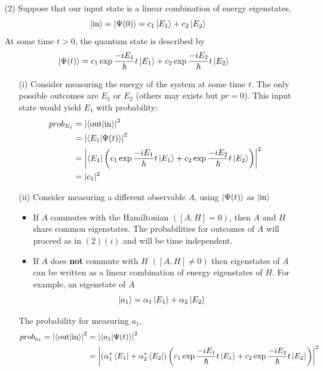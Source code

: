 \documentclass[english, 11pt]{article}
\begin{document}
\begin{itemize}
      \item[(2)] Suppose that our input state is a linear combination of energy eigenstates,
      \[ \left|\mbox{in}\right\rangle = \left|\Psi(0)\right\rangle = c_1\left|E_1\right\rangle + c_2\left|E_2\right\rangle \]
      At some time $t > 0$, the quantum state is described by
      \begin{align*}
        \left|\Psi(t)\right\rangle & = c_1\exp{\frac{-iE_1}{\hbar} t}\left|E_1\right\rangle + c_2\exp{\frac{-iE_2}{\hbar} t}\left|E_2\right\rangle
      \end{align*}
      \begin{itemize}
        \item[(i)] Consider measuring the energy of the system at some time $t$. The only possible outcomes are $E_1$ or $E_2$ (others may exists but $pr = 0$). This input state would yield $E_1$ with probability:
        \begin{align*}
          prob_{E_1} & = \left| \braket{\mbox{out}}{\mbox{in}} \right|^2 \\
                      & = \pr{\braket{E_1}{\Psi(t)}} \\
                      & = \pr{\bra{E_1}\left( c_1 \exp{\f{-iE_1}{\hbar} t}\ket{E_1} + c_2\exp{\f{-iE_2}{\hbar} t}\ket{E_2} \right)} \\
                      & = |c_1|^2
        \end{align*}
        \item[(ii)] Consider measuring a different observable $A$, using $\left|\Psi(t)\right\rangle$ as $\left|\mbox{in}\right\rangle$
        \begin{itemize}
          \item If $A$ commutes with the Hamiltonian $([A,H] =0)$, then $A$ and $H$ share common eigenstates. The probabilities for outcomes of $A$ will proceed as in $(2)(i)$ and will be time independent.
          \item If $A$ does \textbf{not} commute with $H$ $([A,H] \not = 0)$ then eigenstates of $A$ can be written as a linear combination of energy eigenstates of $H$. For example, an eigenstate of $A$
          \[ \left|a_1\right\rangle = \alpha_1\left|E_1\right\rangle + \alpha_2\left|E_2\right\rangle \]
        \end{itemize}
        The probability for measuring $a_1$,
        \begin{align*}
          prob_{a_1} = \left| \braket{\mbox{out}}{\mbox{in}} \right|^2 & = \pr{\braket{a_1}{\Psi(t)}} \\
          & = \pr{\left( \alpha_1^*\bra{E_1} + \alpha_2^*\bra{E_2} \right)\left( c_1 \exp{\f{-iE_1}{\hbar} t}\ket{E_1} + c_2\exp{\f{-iE_2}{\hbar} t}\ket{E_2} \right)} \\

\end{align*}
\end{itemize}
\end{itemize}
\end{document}
